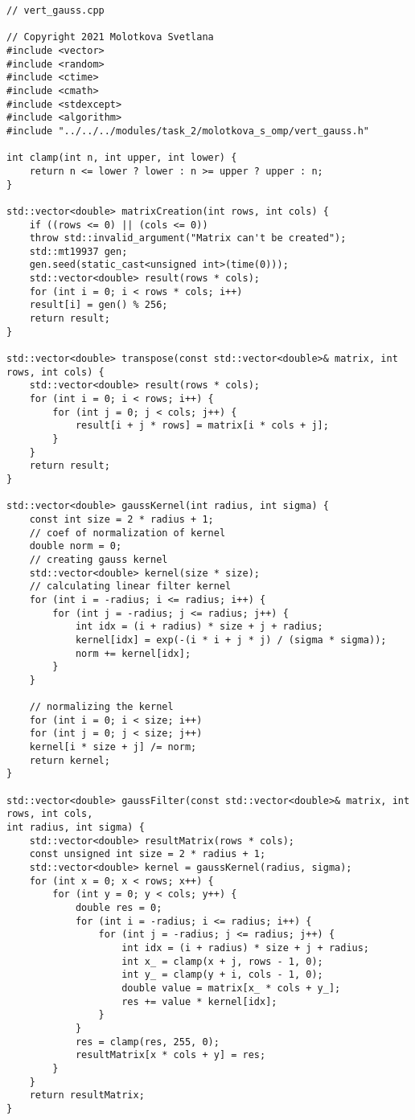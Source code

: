 \documentclass{report}
\begin{document}
\begin{lstlisting}
// vert_gauss.cpp

// Copyright 2021 Molotkova Svetlana
#include <vector>
#include <random>
#include <ctime>
#include <cmath>
#include <stdexcept>
#include <algorithm>
#include "../../../modules/task_2/molotkova_s_omp/vert_gauss.h"

int clamp(int n, int upper, int lower) {
	return n <= lower ? lower : n >= upper ? upper : n;
}

std::vector<double> matrixCreation(int rows, int cols) {
	if ((rows <= 0) || (cols <= 0))
	throw std::invalid_argument("Matrix can't be created");
	std::mt19937 gen;
	gen.seed(static_cast<unsigned int>(time(0)));
	std::vector<double> result(rows * cols);
	for (int i = 0; i < rows * cols; i++)
	result[i] = gen() % 256;
	return result;
}

std::vector<double> transpose(const std::vector<double>& matrix, int rows, int cols) {
	std::vector<double> result(rows * cols);
	for (int i = 0; i < rows; i++) {
		for (int j = 0; j < cols; j++) {
			result[i + j * rows] = matrix[i * cols + j];
		}
	}
	return result;
}

std::vector<double> gaussKernel(int radius, int sigma) {
	const int size = 2 * radius + 1;
	// coef of normalization of kernel
	double norm = 0;
	// creating gauss kernel
	std::vector<double> kernel(size * size);
	// calculating linear filter kernel
	for (int i = -radius; i <= radius; i++) {
		for (int j = -radius; j <= radius; j++) {
			int idx = (i + radius) * size + j + radius;
			kernel[idx] = exp(-(i * i + j * j) / (sigma * sigma));
			norm += kernel[idx];
		}
	}
	
	// normalizing the kernel
	for (int i = 0; i < size; i++)
	for (int j = 0; j < size; j++)
	kernel[i * size + j] /= norm;
	return kernel;
}

std::vector<double> gaussFilter(const std::vector<double>& matrix, int rows, int cols,
int radius, int sigma) {
	std::vector<double> resultMatrix(rows * cols);
	const unsigned int size = 2 * radius + 1;
	std::vector<double> kernel = gaussKernel(radius, sigma);
	for (int x = 0; x < rows; x++) {
		for (int y = 0; y < cols; y++) {
			double res = 0;
			for (int i = -radius; i <= radius; i++) {
				for (int j = -radius; j <= radius; j++) {
					int idx = (i + radius) * size + j + radius;
					int x_ = clamp(x + j, rows - 1, 0);
					int y_ = clamp(y + i, cols - 1, 0);
					double value = matrix[x_ * cols + y_];
					res += value * kernel[idx];
				}
			}
			res = clamp(res, 255, 0);
			resultMatrix[x * cols + y] = res;
		}
	}
	return resultMatrix;
}


\end{lstlisting}
\end{document}
